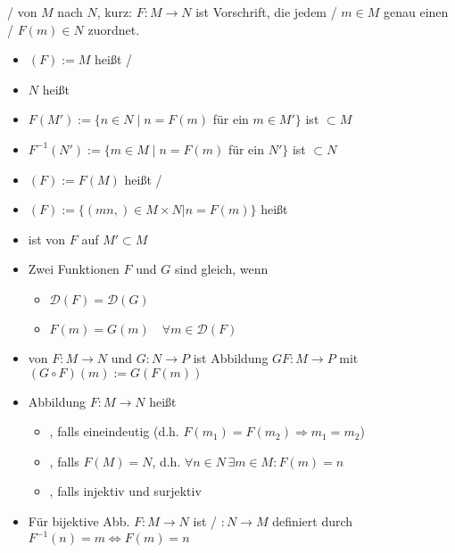 \begin{definition}[Abbildung]
	/ von $M$ nach $N$, kurz: $F:M\rightarrow N$ ist Vorschrift, die jedem  /  $m\in M$ genau einen  /  $F(m)\in N$ zuordnet.
	
	\begin{itemize}
		\item {}$(F):=M$ heißt  / 
		\item $N$ heißt 
		\item $F(M'):=\{n\in N \mid n=F(m)$ für ein $m\in M'\}$ ist $\subset M$
		\item $F^{-1}(N'):=\{ m\in M\mid n=F(m)$ für ein $N' \}$ ist $\subset N$
		\item {}$(F):= F(M)$ heißt  / 
		\item {}$(F) :=\{ (mn,)\in M\times N | n = F(m)\}$ heißt 
		\item {} ist  von $F$ auf $M'\subset M$
		\item Zwei Funktionen $F$ und $G$ sind gleich, wenn
		\begin{itemize}
			\item $\mathcal{D}(F)=\mathcal{D}(G)$
			\item $F(m)=G(m)\quad\forall m\in\mathcal{D}(F)$
		\end{itemize}
		\item {} von $F:M\rightarrow N$ und $G:N\rightarrow P$ ist Abbildung $G$$F:M\rightarrow P$ mit $(G\circ F)(m):=G(F(m))$
		\item Abbildung $F:M\rightarrow N$ heißt
		\begin{itemize}
			\item {}, falls eineindeutig (d.h. $F(m_1) = F(m_2) \Rightarrow m_1 = m_2$)
			\item {}, falls $F(M) = N$, d.h. $\forall n\in N\,\exists m\in M: F(m) = n$
			\item {}, falls injektiv und surjektiv
		\end{itemize}
		\item Für bijektive Abb. $F:M\rightarrow N$ ist  /  $:N\rightarrow M$ definiert durch $F^{-1}(n) = m \Leftrightarrow F(m) = n$
	\end{itemize}
\end{definition}

